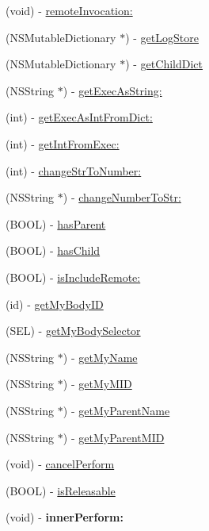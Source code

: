 \begin{DoxyCompactItemize}
(void) -\/ \hyperlink{interface_messenger_system_aaaa066451fb04c37c88e6a7efc94c63e}{remoteInvocation:}
\item 
(NSMutableDictionary $\ast$) -\/ \hyperlink{interface_messenger_system_a857e1c7932fdb366b52b687832c8e0bf}{getLogStore}
\item 
(NSMutableDictionary $\ast$) -\/ \hyperlink{interface_messenger_system_a057d907e4e7325c927580ace6701f95c}{getChildDict}
\item 
(NSString $\ast$) -\/ \hyperlink{interface_messenger_system_a1a0013cb76d7f354e7d71e09e0456766}{getExecAsString:}
\item 
(int) -\/ \hyperlink{interface_messenger_system_aef3cf1f4d71c77f66e6053dcd277beba}{getExecAsIntFromDict:}
\item 
(int) -\/ \hyperlink{interface_messenger_system_a881655597ee31052ca7cd72acd1343c2}{getIntFromExec:}
\item 
(int) -\/ \hyperlink{interface_messenger_system_a9c32da2a99a87a32c2567b29b4d411ac}{changeStrToNumber:}
\item 
(NSString $\ast$) -\/ \hyperlink{interface_messenger_system_ace36dcb764d249819d4ea85fac0afe5c}{changeNumberToStr:}
\item 
(BOOL) -\/ \hyperlink{interface_messenger_system_a4ab801cff2356929a18a551b3537f435}{hasParent}
\item 
(BOOL) -\/ \hyperlink{interface_messenger_system_a9db1bcbbaf0abb9e8e1af5a2aa5bf9fa}{hasChild}
\item 
(BOOL) -\/ \hyperlink{interface_messenger_system_a975357de1acaa17f15d90e67d0203ff4}{isIncludeRemote:}
\item 
(id) -\/ \hyperlink{interface_messenger_system_a7ebd928ddb4092333370af98d34095ed}{getMyBodyID}
\item 
(SEL) -\/ \hyperlink{interface_messenger_system_a0c021c0bc0628174e8b16f664205ebf6}{getMyBodySelector}
\item 
(NSString $\ast$) -\/ \hyperlink{interface_messenger_system_a8d6c34458dcb7c44337b68b2c47c9050}{getMyName}
\item 
(NSString $\ast$) -\/ \hyperlink{interface_messenger_system_a53fb306c1c478aafd66a039cf08e9f53}{getMyMID}
\item 
(NSString $\ast$) -\/ \hyperlink{interface_messenger_system_a8480affbc74b87d15b301d5b32681a70}{getMyParentName}
\item 
(NSString $\ast$) -\/ \hyperlink{interface_messenger_system_a59c153b480be68325af6a66f18cecd0b}{getMyParentMID}
\item 
(void) -\/ \hyperlink{interface_messenger_system_a6ffde31c3597bd083b47e30d26eb926f}{cancelPerform}
\item 
(BOOL) -\/ \hyperlink{interface_messenger_system_adcebdb1f9788a0bb75bb4c0433849ace}{isReleasable}
\item 
\hypertarget{interface_messenger_system_acd15a25f39e26b450bb1c33edd1f2d51}{
(void) -\/ {\bfseries innerPerform:}}
\label{dc/dc9/interface_messenger_system_acd15a25f39e26b450bb1c33edd1f2d51}


\end{DoxyCompactItemize}
